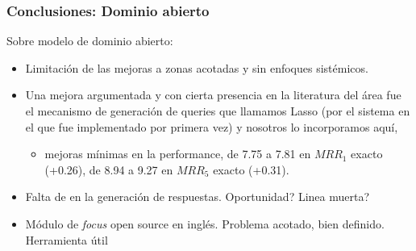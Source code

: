 \begin{frame}
\frametitle{Conclusiones: Dominio abierto}

Sobre modelo de dominio abierto:
  \begin{itemize}
 \item Limitación de las mejoras a zonas acotadas y sin enfoques sistémicos. 
 \item Una mejora argumentada y con cierta presencia en la literatura del área fue el mecanismo de generación de queries que llamamos Lasso (por el sistema en el que fue implementado por primera vez) y nosotros lo incorporamos aquí, 
\begin{itemize}
    \item  mejoras mínimas en la performance, de 7.75 a 7.81 en $MRR_1$ exacto (+0.26), de 8.94 a 9.27 en $MRR_5$ exacto (+0.31). 
  \end{itemize}
  \item Falta de  en la generación de respuestas. Oportunidad? Linea muerta? 
\item Módulo de \textit{focus} open source en inglés. Problema acotado, bien definido. Herramienta útil
  \end{itemize}
\end{frame}
